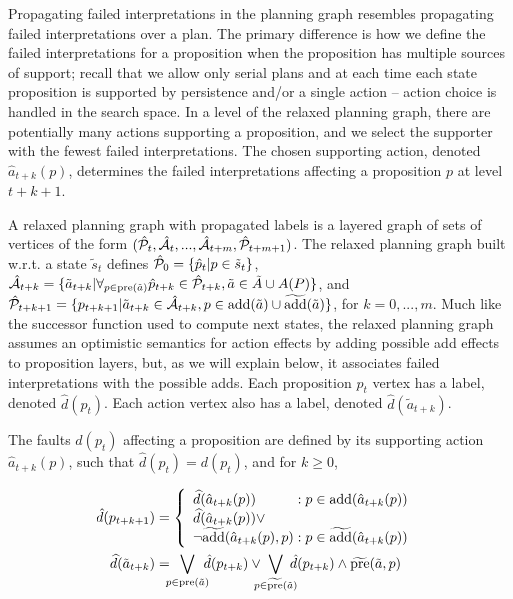 \documentclass{article}
\def\und#1{\noindent{\bf #1}:}
\def\und#1{\medskip{\noindent\bf #1:}}
\begin{document}
\und{Incomplete Domain Heuristics} Propagating failed interpretations in the planning graph resembles propagating failed interpretations over a plan.  The primary difference is how we define the failed interpretations for a proposition when the proposition has multiple sources of support; recall that we allow only serial plans and at each time each state proposition is supported by persistence and/or a single action -- action choice is handled in the search space. 
In a level of the relaxed planning graph, there are potentially many actions supporting a proposition, and we select the supporter with the fewest failed interpretations. The chosen supporting action, denoted $\hat{a}_{t+k}(p)$, determines the failed interpretations affecting a proposition $p$ at level $t+k+1$.


A relaxed planning graph with propagated labels is a layered
graph of sets of vertices of the form $(\hat{\cal P}_t, \hat{\cal A}_t, ..., \hat{\cal
A}_{t+m}, \hat{\cal P}_{t+m+1})$. The relaxed planning graph built w.r.t. a state $\tilde{s}_t$ defines $\hat{\cal P}_0 = \{\hat{p}_t | p \in \tilde{s}_t\}$, $\hat{\cal A}_{t+k} = \{ \tilde{a}_{t+k} | \forall_{p \in \text{pre}(\tilde{a})} \hat{p}_{t+k} \in \hat{\cal P}_{t+k}, \tilde{a} \in \tilde{A} \cup A(P)\}$, and $\hat{\cal P}_{t+k+1} = \{p_{t+k+1} | \tilde{a}_{t+k} \in \hat{\cal A}_{t+k}, p \in \text{add}(\tilde{a}) \cup \widetilde{\text{add}}(\tilde{a})\}$, for $k = 0, ..., m$.  Much like the successor function used to compute next states, the relaxed planning graph assumes an optimistic semantics for action effects by adding possible add effects to proposition layers, but, as we will explain below, it associates failed interpretations with the possible adds.  Each proposition $p_{t}$ vertex has a label, denoted $\hat{d}(p_t)$.  Each action vertex also has a label, denoted $\widehat{d}(\tilde{a}_{t+k})$.

The faults $\hat{d}(p_t) $ affecting a proposition are defined by its supporting action $\hat{a}_{t+k}(p)$, such that $\hat{d}(p_t) = d(p_t)$, and for $k \geq 0$, 

\begin{align}
 \hspace*{-.6cm} \hat{d}(p_{t+k+1}) &= 
\left\{\begin{array}{l@{\;}l@{\;}r}
\widehat{d}(\hat{a}_{t+k}(p)) & : p \in \text{add}(\hat{a}_{t+k}(p))\\
\widehat{d}(\hat{a}_{t+k}(p)) \vee \\
\neg\widetilde{\text{add}}(\hat{a}_{t+k}(p), p) & : p \in \widetilde{\text{add}}(\hat{a}_{t+k}(p))\end{array}\right. \hspace*{-.1cm}\\
\widehat{d}(\tilde{a}_{t+k}) &= \hspace*{-.2cm} 
\bigvee\limits_{p \in \text{pre}(\tilde{a}) } \hspace*{-.2cm}   \hat{d}(p_{t+k}) \vee \hspace*{-.25cm} 
\bigvee\limits_{p \in \widetilde{\text{pre}}(\tilde{a})} \hspace*{-.25cm}  \hat{d}(p_{t+k})  \wedge  \widetilde{\text{pre}}(\tilde{a}, p) 
\end{align}
\end{document}
